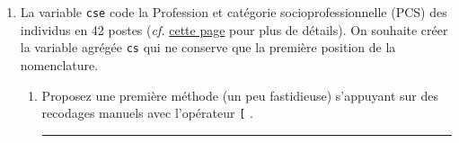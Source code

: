 \documentclass[12pt,twosided, notitlepage]{book}
\newenvironment{Shaded}{}{}
\newcommand{\CommentTok}[1]{\textcolor[rgb]{0.00,0.50,0.00}{#1}}
\newcommand{\KeywordTok}[1]{\textcolor[rgb]{0.00,0.00,1.00}{#1}}
\newcommand{\NormalTok}[1]{#1}
\newcommand{\OperatorTok}[1]{#1}
\newif \ifsol
\renewenvironment{Shaded}{\begin{snugshade}}{\end{snugshade}}
\begin{document}
\begin{enumerate}
\def\labelenumi{\alph{enumi}.}
\item
  La variable \texttt{cse} code la Profession et catégorie
  socioprofessionnelle (PCS) des individus en 42 postes (\emph{cf.}
  \href{https://www.insee.fr/fr/information/2400059}{cette page} pour
  plus de détails). On souhaite créer la variable agrégée \texttt{cs}
  qui ne conserve que la première position de la nomenclature.

  \begin{enumerate}
  \def\labelenumii{\roman{enumii}.}
  \item
    Proposez une première méthode (un peu fastidieuse) s'appuyant sur
    des recodages manuels avec l'opérateur \texttt{{[}}
    \index{\texttt{[}}.

    \ifsol 

    \begin{center} \rule{0.5\linewidth}{\linethickness}\end{center}

\begin{Shaded}
\end{Shaded}
\end{enumerate}
\end{enumerate}
\end{document}
